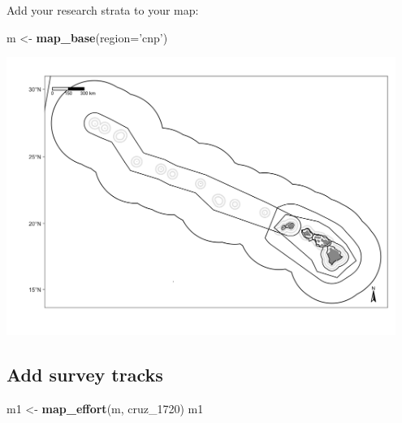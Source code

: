 \documentclass[
]{book}
\newenvironment{Shaded}{\begin{snugshade}}{\end{snugshade}}
\newcommand{\DataTypeTok}[1]{\textcolor[rgb]{0.13,0.29,0.53}{#1}}
\newcommand{\DecValTok}[1]{\textcolor[rgb]{0.00,0.00,0.81}{#1}}
\newcommand{\KeywordTok}[1]{\textcolor[rgb]{0.13,0.29,0.53}{\textbf{#1}}}
\newcommand{\NormalTok}[1]{#1}
\newcommand{\OperatorTok}[1]{\textcolor[rgb]{0.81,0.36,0.00}{\textbf{#1}}}
\newcommand{\StringTok}[1]{\textcolor[rgb]{0.31,0.60,0.02}{#1}}
\begin{document}
Add your research strata to your map:

\begin{Shaded}
\begin{Highlighting}[]
\NormalTok{m <-}\StringTok{ }\KeywordTok{map_base}\NormalTok{(}\DataTypeTok{region=}\StringTok{'cnp'}\NormalTok{)}
\end{Highlighting}
\end{Shaded}

\begin{Shaded}
\end{Shaded}

\includegraphics[width=0.95\textwidth,height=\textheight]{img/map_cnp_strata.png}

\hypertarget{add-survey-tracks}{%
\subsection*{Add survey tracks}\label{add-survey-tracks}}

\begin{Shaded}
\begin{Highlighting}[]
\NormalTok{m1 <-}\StringTok{ }\KeywordTok{map_effort}\NormalTok{(m, cruz_}\DecValTok{1720}\NormalTok{)}
\NormalTok{m1}
\end{Highlighting}
\end{Shaded}
\end{document}
